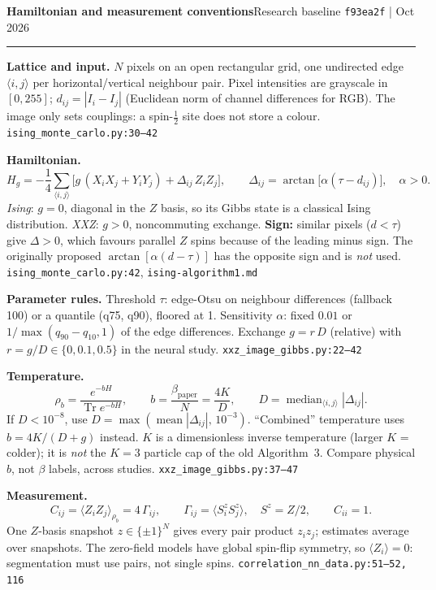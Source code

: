 \documentclass[10pt]{article}
\newcommand{\code}[1]{\texttt{\small #1}}
\begin{document}
{\large\bfseries Hamiltonian and measurement conventions}\hfill {\small Research baseline \code{f93ea2f} \;| Oct 2026}

\vspace{-2pt}\rule{\linewidth}{0.4pt}

\textbf{Lattice and input.}
$N$ pixels on an open rectangular grid, one undirected edge $\langle i,j\rangle$ per horizontal/vertical neighbour pair.
Pixel intensities are grayscale in $[0,255]$; $d_{ij}=|I_i-I_j|$ (Euclidean norm of channel differences for RGB).
The image only sets couplings: a spin-$\tfrac12$ site does not store a colour.
\hfill\code{ising\_monte\_carlo.py:30--42}

\textbf{Hamiltonian.}
\[
H_g=-\frac14\sum_{\langle i,j\rangle}\Big[g\,(X_iX_j+Y_iY_j)+\Delta_{ij}\,Z_iZ_j\Big],
\qquad
\Delta_{ij}=\arctan\!\big[\alpha(\tau-d_{ij})\big],\quad \alpha>0 .
\]
\emph{Ising}: $g=0$, diagonal in the $Z$ basis, so its Gibbs state is a classical Ising distribution.
\emph{XXZ}: $g>0$, noncommuting exchange.
\textbf{Sign:} similar pixels ($d<\tau$) give $\Delta>0$, which favours parallel $Z$ spins because of the leading minus sign.
The originally proposed $\arctan[\alpha(d-\tau)]$ has the opposite sign and is \emph{not} used.
\hfill\code{ising\_monte\_carlo.py:42}, \code{ising-algorithm1.md}

\textbf{Parameter rules.}
Threshold $\tau$: edge-Otsu on neighbour differences (fallback 100) or a quantile (q75, q90), floored at 1.
Sensitivity $\alpha$: fixed $0.01$ or $1/\max(q_{90}-q_{10},1)$ of the edge differences.
Exchange $g=r\,D$ (relative) with $r=g/D\in\{0,0.1,0.5\}$ in the neural study.
\hfill\code{xxz\_image\_gibbs.py:22--42}

\textbf{Temperature.}
\[
\rho_b=\frac{e^{-bH}}{\operatorname{Tr}e^{-bH}},\qquad
b=\frac{\beta_{\text{paper}}}{N}=\frac{4K}{D},\qquad D=\operatorname{median}_{\langle i,j\rangle}|\Delta_{ij}| .
\]
If $D<10^{-8}$, use $D=\max(\operatorname{mean}|\Delta_{ij}|,\,10^{-3})$. ``Combined'' temperature uses $b=4K/(D+g)$ instead.
$K$ is a dimensionless inverse temperature (larger $K$ = colder); it is \emph{not} the $K=3$ particle cap of the old Algorithm~3.
Compare physical $b$, not $\beta$ labels, across studies.
\hfill\code{xxz\_image\_gibbs.py:37--47}

\textbf{Measurement.}
\[
C_{ij}=\langle Z_iZ_j\rangle_{\rho_b}=4\,\Gamma_{ij},\qquad \Gamma_{ij}=\langle S^z_iS^z_j\rangle,\quad S^z=Z/2,\qquad C_{ii}=1 .
\]
One $Z$-basis snapshot $z\in\{\pm1\}^N$ gives every pair product $z_iz_j$; estimates average over snapshots.
The zero-field models have global spin-flip symmetry, so $\langle Z_i\rangle=0$: segmentation must use pairs, not single spins.
\hfill\code{correlation\_nn\_data.py:51--52, 116}
\end{document}
